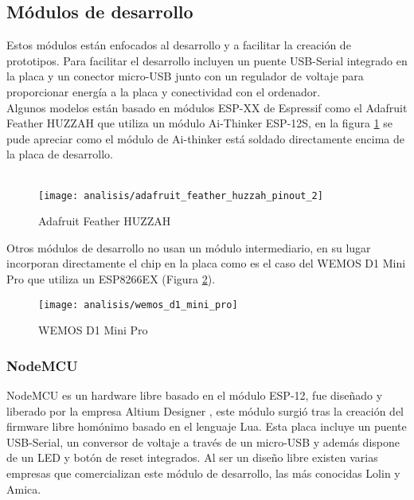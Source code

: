 \documentclass[../proyecto.tex]{subfiles}
\begin{document}
\subsection{Módulos de desarrollo}

Estos módulos están enfocados al desarrollo y a facilitar la creación de prototipos. Para facilitar el desarrollo incluyen un puente USB-Serial integrado en la placa y un conector micro-USB junto con un regulador de voltaje para proporcionar energía a la placa y conectividad con el ordenador.\\

Algunos modelos están basado en módulos ESP-XX de Espressif como el Adafruit Feather HUZZAH \cite{adafruit_feather_huzzah} que utiliza un módulo Ai-Thinker ESP-12S, en la figura \ref{fig:adafruit_feather_huzzah_pinout_2} se pude apreciar como el módulo de Ai-thinker está soldado directamente encima de la placa de desarrollo.\\~\\

\begin{figure}[H]
\centering
\texttt{[image: analisis/adafruit\_feather\_huzzah\_pinout\_2]}
\caption{Adafruit Feather HUZZAH}
\label{fig:adafruit_feather_huzzah_pinout_2}
\end{figure}

Otros módulos de desarrollo no usan un módulo intermediario, en su lugar incorporan directamente el chip en la placa como es el caso del WEMOS D1 Mini Pro \cite{wemos_d1_mini_pro} que utiliza un ESP8266EX (Figura \ref{fig:wemos_d1_mini_pro}).\\

\begin{figure}[h]
\centering
\texttt{[image: analisis/wemos\_d1\_mini\_pro]}
\caption{WEMOS D1 Mini Pro}
\label{fig:wemos_d1_mini_pro}
\end{figure}

\subsubsection{NodeMCU}
NodeMCU es un hardware libre basado en el módulo ESP-12, fue diseñado y liberado por la empresa Altium Designer \cite{nodemcu_devkit_repository}, este módulo surgió tras la creación del firmware libre homónimo basado en el lenguaje Lua. Esta placa incluye un puente USB-Serial, un conversor de voltaje  a través de un micro-USB y además dispone de un LED y botón de reset integrados. Al ser un diseño libre existen varias empresas que comercializan este módulo de desarrollo, las más conocidas Lolin y Amica.\\
\end{document}
